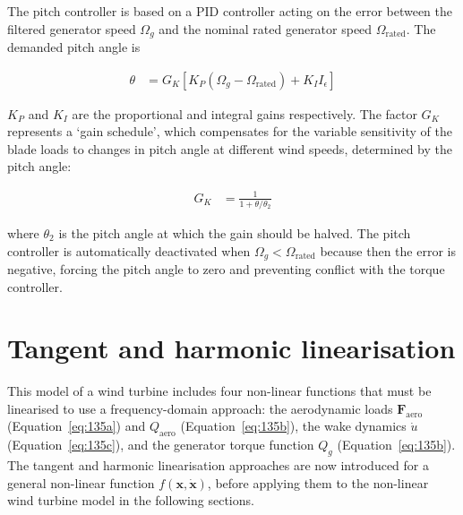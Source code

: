 \documentclass[preprint]{elsarticle}
\newcommand{\mathup}{\mathrm}
\begin{document}
The pitch controller is based on a PID controller acting on the error between
the filtered generator speed $\Omega_g$ and the nominal rated generator speed
$\Omega_{\mathup{rated}}$. The demanded pitch angle is
\begin{linenomath}\begin{align}
  \label{eq:193}
    \theta{} &= G_K \left[ K_P \left( \Omega_g - \Omega_{\mathup{rated}} \right) + K_I I_\epsilon \right]
\end{align}\end{linenomath}
$K_P$ and $K_I$ are the proportional and integral gains respectively. The
factor $G_K$ represents a `gain schedule', which compensates for the variable
sensitivity of the blade loads to changes in pitch angle at different wind
speeds, determined by the pitch angle:
\begin{linenomath}\begin{align}
  \label{eq:194}
  G_K &= \frac{1}{1 + \theta{} / \theta{}_2}
\end{align}\end{linenomath}
where $\theta{}_2$ is the pitch angle at which the gain should be halved. The pitch
controller is automatically deactivated when $\Omega_g < \Omega_{\mathup{rated}}$ because
then the error is negative, forcing the pitch angle to zero and preventing
conflict with the torque controller.

\section{Tangent and harmonic linearisation}
\label{sec:linearisation}

This model of a wind turbine includes four non-linear functions that must be
linearised to use a frequency-domain approach: the aerodynamic loads
$\boldsymbol{F}_{\textrm{aero}}$ (Equation~\ref{eq:135a}) and $Q_{\textrm{aero}}$
(Equation~\ref{eq:135b}), the wake dynamics $\dot{u}$ (Equation~\ref{eq:135c}),
and the generator torque function $Q_g$ (Equation~\ref{eq:135b}). The tangent
and harmonic linearisation approaches are now introduced for a general
non-linear function $f(\mathbf{x}, \dot{\mathbf{x}})$, before applying them to
the non-linear wind turbine model in the following sections.
\end{document}
